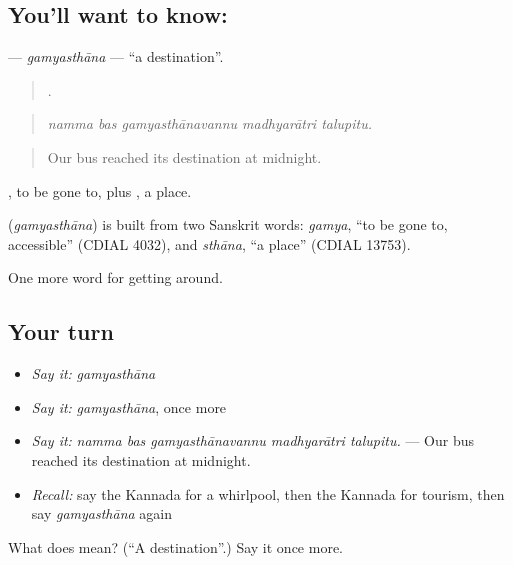\subsection*{You'll want to know: }
\textbf{} — \emph{gamyasthāna} — \textquotedblleft{}a destination\textquotedblright{}.

\begin{quote}
    .
\end{quote}

\begin{quote}
\emph{namma bas gamyasthānavannu madhyarātri talupitu.}
\end{quote}

\begin{quote}
Our bus reached its destination at midnight.
\end{quote}

, to be gone to, plus , a place.

\begin{cousinweb}
\textbf{} (\emph{gamyasthāna}) is built from two Sanskrit words: \emph{gamya}, \textquotedblleft{}to be gone to, accessible\textquotedblright{} (CDIAL 4032), and \emph{sthāna}, \textquotedblleft{}a place\textquotedblright{} (CDIAL 13753).
\end{cousinweb}

\begin{grammarlens}[title={What you've built}]
One more word for getting around.
\end{grammarlens}

\subsection*{Your turn}
\begin{itemize}
\raggedright
  \item \emph{Say it:} \emph{gamyasthāna}
  \item \emph{Say it:} \emph{gamyasthāna}, once more
  \item \emph{Say it:} \emph{namma bas gamyasthānavannu madhyarātri talupitu.} — Our bus reached its destination at midnight.
  \item \emph{Recall:} say the Kannada for a whirlpool, then the Kannada for tourism, then say \emph{gamyasthāna} again
\end{itemize}

\begin{tcolorbox}[breakable,colback=teal!4,colframe=teal!35!black,title={Before you move on}]
What does  mean? (\textquotedblleft{}A destination\textquotedblright{}.) Say it once more.
\end{tcolorbox}
